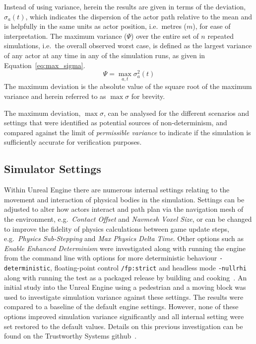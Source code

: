 Instead of using variance, herein the results are given in terms of the deviation, $\sigma_a(t)$, which indicates the dispersion of the actor path relative to the mean and is helpfully in the same units as actor position, i.e.\ metres ($m$), for ease of interpretation. The maximum variance ($\Psi$) over the entire set of $n$ repeated simulations, i.e.\ the overall observed worst case, is defined as the largest variance of any actor at any time in any of the simulation runs, as given in Equation~\ref{eq:max_sigma}. 
\begin{equation} \label{eq:max_sigma}
\Psi = \max_{a,t}\sigma_a^{2}(t)
\end{equation}
The maximum deviation is the absolute value of the square root of the maximum variance and herein referred to as ${\max\sigma}$ for brevity. 

The maximum deviation, $\max\sigma$, can be analysed for the different scenarios and settings that were identified as potential sources of non-determinism, and compared against the limit of \textit{permissible variance} to indicate if the simulation is sufficiently accurate for verification purposes.



\subsection{Simulator Settings}

Within Unreal Engine there are numerous internal settings relating to the movement and interaction of physical bodies in the simulation. Settings can be adjusted to alter how actors interact and path plan via the navigation mesh of the environment, e.g.\ \textit{Contact Offset} and \textit{Navmesh Voxel Size}, or can be changed to improve the fidelity of physics calculations between game update steps, e.g.\ \textit{Physics Sub-Stepping} and \textit{Max Physics Delta Time}. Other options such as \textit{Enable Enhanced Determinism} were investigated along with running the engine from the command line with options for more deterministic behaviour \texttt{-deterministic}, floating-point control \texttt{/fp:strict} and headless mode \texttt{-nullrhi} along with running the test as a packaged release by building and cooking~\cite{releasing_project}. An initial study into the Unreal Engine using a pedestrian and a moving block was used to investigate simulation variance against these settings. The results were compared to a baseline of the default engine settings. However, none of these options improved simulation variance significantly and all internal setting were set restored to the default values. Details on this previous investigation can be found on the Trustworthy Systems github~\cite{TSLUnrealEngineTesting}. 



